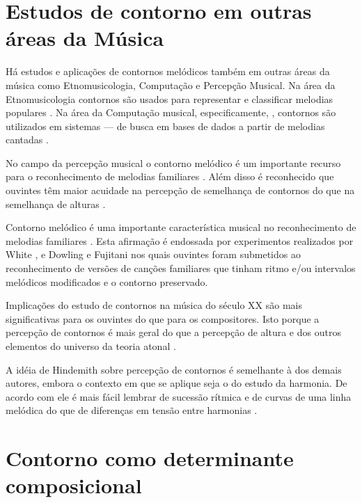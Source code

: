 \section{Estudos de contorno em outras áreas da Música}
\label{sec:estudos-de-contorno}

Há estudos e aplicações de contornos melódicos também em outras áreas
da música como Etnomusicologia, Computação e Percepção Musical. Na
área da Etnomusicologia contornos são usados para representar e
classificar melodias populares \cite{adams76:melodic}. Na área da
Computação musical, especificamente, , contornos são utilizados em sistemas  --- de busca em bases de dados a partir de melodias
cantadas \cite{ghias.ea95:query}.

No campo da percepção musical o contorno melódico é um importante
recurso para o reconhecimento de melodias familiares \cite[p.
136]{dowling.ea86:music}. Além disso é reconhecido que ouvintes têm
maior acuidade na percepção de semelhança de contornos do que na
semelhança de alturas \cite[p. 226]{marvin.ea87:relating}.

Contorno melódico é uma importante característica musical no
reconhecimento de melodias familiares
\cite[p. 136]{dowling.ea86:music}. Esta afirmação é endossada por
experimentos realizados por White \cite{white60:recognition}, e
Dowling e Fujitani \cite{dowling.ea71:contour} nos quais ouvintes
foram submetidos ao reconhecimento de versões de canções familiares
que tinham ritmo e/ou intervalos melódicos modificados e o contorno
preservado.

Implicações do estudo de contornos na música do século XX são mais
significativas para os ouvintes do que para os compositores. Isto
porque a percepção de contornos é mais geral do que a percepção de
altura e dos outros elementos do universo da teoria atonal
\cite[p. 224]{friedmann85:methodology}.

A idéia de Hindemith sobre percepção de contornos é semelhante à dos
demais autores, embora o contexto em que se aplique seja o do estudo
da harmonia. De acordo com ele é mais fácil lembrar de sucessão
rítmica e de curvas de uma linha melódica do que de diferenças em
tensão entre harmonias \cite[p. 175]{hindemith41:craft}.

\section{Contorno como determinante composicional}
\label{sec:cont-como-determ}

